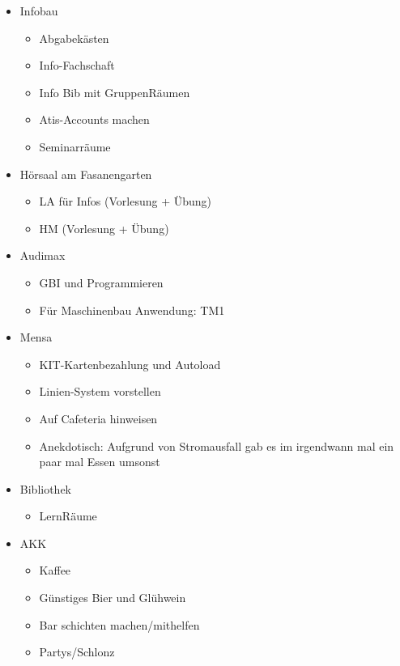 \documentclass[10pt,ngerman]{scrartcl}
\begin{document}
\begin{multicols}{2}
\begin{itemize}
    \item Infobau
        \begin{itemize}
            \item Abgabekästen
            \item Info-Fachschaft
            \item Info Bib mit GruppenRäumen
            \item Atis-Accounts machen
            \item Seminarräume
        \end{itemize}
    \item Hörsaal am Fasanengarten
        \begin{itemize}
            \item LA für Infos (Vorlesung + Übung)
            \item HM (Vorlesung + Übung)
        \end{itemize}
    \item Audimax
        \begin{itemize}
            \item GBI und Programmieren
            \item Für Maschinenbau Anwendung: TM1
        \end{itemize}
    \item Mensa
        \begin{itemize}
            \item KIT-Kartenbezahlung und Autoload
            \item Linien-System vorstellen
            \item Auf Cafeteria hinweisen
            \item Anekdotisch: Aufgrund von Stromausfall gab es im irgendwann mal ein paar mal Essen umsonst
        \end{itemize}
    \item Bibliothek
        \begin{itemize}
            \item LernRäume
        \end{itemize}
    \item AKK
        \begin{itemize}
            \item Kaffee
            \item Günstiges Bier und Glühwein
            \item Bar schichten machen/mithelfen
            \item Partys/Schlonz

\end{itemize}
\end{itemize}
\end{multicols}
\end{document}
